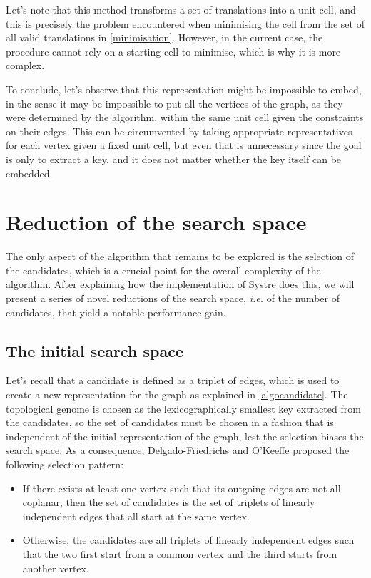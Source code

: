 \documentclass[main.tex]{subfiles}
\begin{document}
Let's note that this method transforms a set of translations into a unit cell, and this is precisely the problem encountered when minimising the cell from the set of all valid translations in \autoref{minimisation}. However, in the current case, the procedure cannot rely on a starting cell to minimise, which is why it is more complex.

To conclude, let's observe that this representation might be impossible to embed, in the sense it may be impossible to put all the vertices of the graph, as they were determined by the algorithm, within the same unit cell given the constraints on their edges. This can be circumvented by taking appropriate representatives for each vertex given a fixed unit cell, but even that is unnecessary since the goal is only to extract a key, and it does not matter whether the key itself can be embedded.




\section{Reduction of the search space}

\label{searchspacereduction}

The only aspect of the algorithm that remains to be explored is the selection of the candidates, which is a crucial point for the overall complexity of the algorithm. After explaining how the implementation of Systre does this, we will present a series of novel reductions of the search space, \textit{i.e.} of the number of candidates, that yield a notable performance gain.

\subsection{The initial search space}

Let's recall that a candidate is defined as a triplet of edges, which is used to create a new representation for the graph as explained in \autoref{algocandidate}. The topological genome is chosen as the lexicographically smallest key extracted from the candidates, so the set of candidates must be chosen in a fashion that is independent of the initial representation of the graph, lest the selection biases the search space. As a consequence, Delgado-Friedrichs and O'Keeffe \autocite{Systre} proposed the following selection pattern:
\begin{itemize}[noitemsep]
	\item If there exists at least one vertex such that its outgoing edges are not all coplanar, then the set of candidates is the set of triplets of linearly independent edges that all start at the same vertex.
	\item Otherwise, the candidates are all triplets of linearly independent edges such that the two first start from a common vertex and the third starts from another vertex.
\end{itemize}
\end{document}
